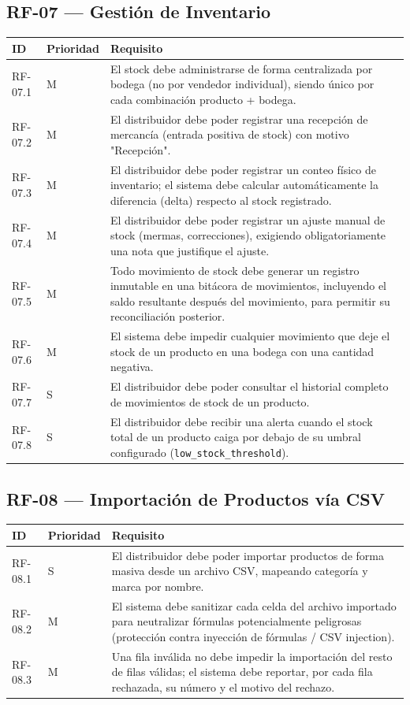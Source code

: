 \documentclass[12pt,a4paper]{report}
\begin{document}
\subsection{RF-07 --- Gestión de Inventario}

\begin{longtable}{|p{2cm}|p{2cm}|p{10cm}|}
\hline
\textbf{ID} & \textbf{Prioridad} & \textbf{Requisito} \\ \hline
RF-07.1 & M & El stock debe administrarse de forma centralizada por bodega (no por vendedor individual), siendo único por cada combinación producto + bodega. \\ \hline
RF-07.2 & M & El distribuidor debe poder registrar una recepción de mercancía (entrada positiva de stock) con motivo "Recepción". \\ \hline
RF-07.3 & M & El distribuidor debe poder registrar un conteo físico de inventario; el sistema debe calcular automáticamente la diferencia (delta) respecto al stock registrado. \\ \hline
RF-07.4 & M & El distribuidor debe poder registrar un ajuste manual de stock (mermas, correcciones), exigiendo obligatoriamente una nota que justifique el ajuste. \\ \hline
RF-07.5 & M & Todo movimiento de stock debe generar un registro inmutable en una bitácora de movimientos, incluyendo el saldo resultante después del movimiento, para permitir su reconciliación posterior. \\ \hline
RF-07.6 & M & El sistema debe impedir cualquier movimiento que deje el stock de un producto en una bodega con una cantidad negativa. \\ \hline
RF-07.7 & S & El distribuidor debe poder consultar el historial completo de movimientos de stock de un producto. \\ \hline
RF-07.8 & S & El distribuidor debe recibir una alerta cuando el stock total de un producto caiga por debajo de su umbral configurado (\texttt{low\_stock\_threshold}). \\ \hline
\end{longtable}

\subsection{RF-08 --- Importación de Productos vía CSV}

\begin{longtable}{|p{2cm}|p{2cm}|p{10cm}|}
\hline
\textbf{ID} & \textbf{Prioridad} & \textbf{Requisito} \\ \hline
RF-08.1 & S & El distribuidor debe poder importar productos de forma masiva desde un archivo CSV, mapeando categoría y marca por nombre. \\ \hline
RF-08.2 & M & El sistema debe sanitizar cada celda del archivo importado para neutralizar fórmulas potencialmente peligrosas (protección contra inyección de fórmulas / CSV injection). \\ \hline
RF-08.3 & M & Una fila inválida no debe impedir la importación del resto de filas válidas; el sistema debe reportar, por cada fila rechazada, su número y el motivo del rechazo. \\ \hline
\end{longtable}
\end{document}
